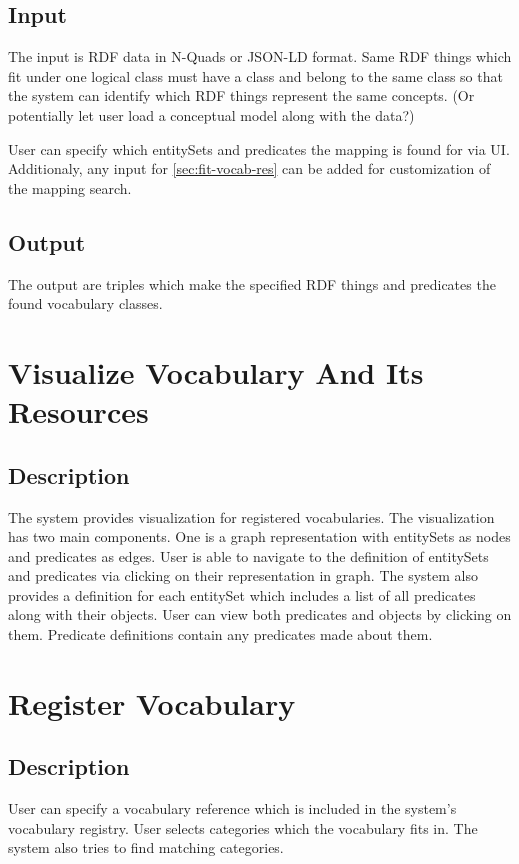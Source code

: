 \subsection{Input}
The input is RDF data in N-Quads or JSON-LD format. Same RDF things which fit under one logical class must have a class and belong to the same class so that the system can identify which RDF things represent the same concepts. (Or potentially let user load a conceptual model along with the data?)

User can specify which entitySets and predicates the mapping is found for via UI. Additionaly, any input for \autoref{sec:fit-vocab-res} can be added for customization of the mapping search.

\subsection{Output}
The output are triples which make the specified RDF things and predicates the found vocabulary classes. 

\section{Visualize Vocabulary And Its Resources}
\subsection{Description}
The system provides visualization for registered vocabularies. The visualization has two main components. One is a graph representation with entitySets as nodes and predicates as edges. User is able to navigate to the definition of entitySets and predicates via clicking on their representation in graph. The system also provides a definition for each entitySet which includes a list of all predicates along with their objects. User can view both predicates and objects by clicking on them. Predicate definitions contain any predicates made about them.

\section{Register Vocabulary}
\subsection{Description}
User can specify a vocabulary reference which is included in the system's vocabulary registry. User selects categories which the vocabulary fits in. The system also tries to find matching categories.

